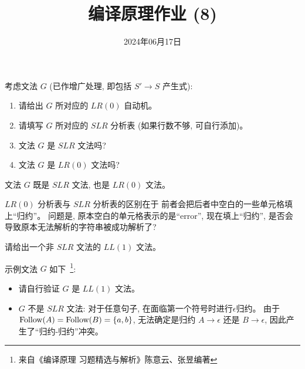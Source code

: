\documentclass[a4paper, justified]{tufte-handout}
\title{编译原理作业 (8)}
\date{2024年06月17日}
\begin{document}
\maketitle
\noplagiarism %
\begin{abstract}
\end{abstract}
\beginrequired

\begin{problem}[$LR$ 语法分析]
  考虑文法 $G$ (已作增广处理, 即包括 $S' \to S$ 产生式):

	

  \begin{enumerate}[(1)]
    \item 请给出 $G$ 所对应的 $LR(0)$ 自动机。
		\item 请填写 $G$ 所对应的 $SLR$ 分析表 (如果行数不够, 可自行添加)。
		\item 文法 $G$ 是 $SLR$ 文法吗?
		\item 文法 $G$ 是 $LR(0)$ 文法吗?
  \end{enumerate}

	\newpage
	
\end{problem}

\begin{solution}
	文法 $G$ 既是 $SLR$ 文法, 也是 $LR(0)$ 文法。

	\vspace{0.20cm}
	 $LR(0)$ 分析表与 $SLR$ 分析表的区别在于
	前者会把后者中空白的一些单元格填上``归约''。
	问题是, 原本空白的单元格表示的是``error'',
	现在填上``归约'', 是否会导致原本无法解析的字符串被成功解析了?
\end{solution}

\begin{problem}
	请给出一个非 $SLR$ 文法的 $LL(1)$ 文法。
\end{problem}

\begin{solution}
	示例文法 $G$ 如下~\footnote{来自《编译原理 习题精选与解析》陈意云、张昱编著}:
	

	\begin{itemize}
		\item 请自行验证 $G$ 是 $LL(1)$ 文法。
		\item $G$ 不是 $SLR$ 文法: 对于任意句子,
		  在面临第一个符号时进行$\epsilon$归约。
			由于 $\text{{Follow}}(A) = \text{{Follow}}(B) = \{a, b\}$,
			无法确定是归约 $A \to \epsilon$ 还是 $B \to \epsilon$,
			因此产生了``归约-归约''冲突。
	\end{itemize}
\end{solution}
\end{document}
